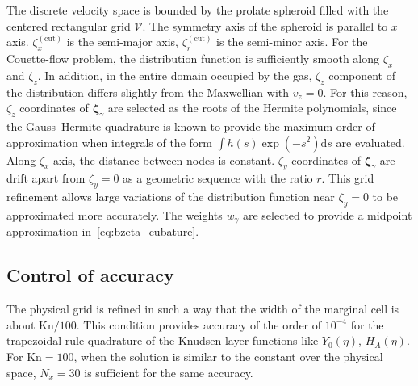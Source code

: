 \documentclass[review]{elsarticle}
\newcommand{\Kn}{\mathrm{Kn}}
\newcommand{\dd}{\mathrm{d}}
\newcommand{\bzeta}{\boldsymbol{\zeta}}
\begin{document}
The discrete velocity space is bounded by the prolate spheroid
filled with the centered rectangular grid \(\mathcal{V}\).
The symmetry axis of the spheroid is parallel to \(x\) axis.
\(\zeta^{(\mathrm{cut})}_x\) is the semi-major axis, \(\zeta^{(\mathrm{cut})}_r\) is the semi-minor axis.
For the Couette-flow problem, the distribution function is sufficiently smooth along \(\zeta_x\) and \(\zeta_z\).
In addition, in the entire domain occupied by the gas, \(\zeta_z\) component of the distribution
differs slightly from the Maxwellian with \(v_z=0\).
For this reason, \(\zeta_z\) coordinates of \(\bzeta_\gamma\) are selected as the roots of the Hermite polynomials,
since the Gauss--Hermite quadrature is known to provide the maximum order of approximation
when integrals of the form \(\int h(s)\exp(-s^2)\dd{s}\) are evaluated.
Along \(\zeta_x\) axis, the distance between nodes is constant.
\(\zeta_y\) coordinates of \(\bzeta_\gamma\) are drift apart from \(\zeta_y=0\)
as a geometric sequence with the ratio \(r\).
This grid refinement allows large variations of the distribution function
near \(\zeta_y=0\) to be approximated more accurately.
The weights \(w_\gamma\) are selected to provide a midpoint approximation in~\eqref{eq:bzeta_cubature}.

\subsection{Control of accuracy}

The physical grid is refined in such a way
that the width of the marginal cell is about \(\Kn/100\).
This condition provides accuracy of the order of \(10^{-4}\) for the trapezoidal-rule quadrature
of the Knudsen-layer functions like \(Y_0(\eta)\), \(H_A(\eta)\).
For \(\Kn=100\), when the solution is similar to the constant over the physical space,
\(N_x = 30\) is sufficient for the same accuracy.
\end{document}
